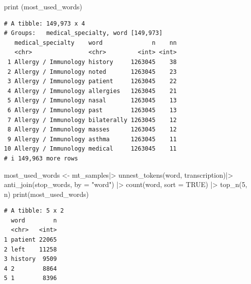 \documentclass[
  letterpaper,
  DIV=11,
  numbers=noendperiod]{scrartcl}
\newenvironment{Shaded}{\begin{snugshade}}{\end{snugshade}}
\newcommand{\AttributeTok}[1]{\textcolor[rgb]{0.40,0.45,0.13}{#1}}
\newcommand{\ConstantTok}[1]{\textcolor[rgb]{0.56,0.35,0.01}{#1}}
\newcommand{\DecValTok}[1]{\textcolor[rgb]{0.68,0.00,0.00}{#1}}
\newcommand{\FunctionTok}[1]{\textcolor[rgb]{0.28,0.35,0.67}{#1}}
\newcommand{\NormalTok}[1]{\textcolor[rgb]{0.00,0.23,0.31}{#1}}
\newcommand{\OtherTok}[1]{\textcolor[rgb]{0.00,0.23,0.31}{#1}}
\newcommand{\SpecialCharTok}[1]{\textcolor[rgb]{0.37,0.37,0.37}{#1}}
\newcommand{\StringTok}[1]{\textcolor[rgb]{0.13,0.47,0.30}{#1}}
\begin{document}
\begin{Shaded}
\begin{Highlighting}[]
\FunctionTok{print}\NormalTok{ (most\_used\_words)}
\end{Highlighting}
\end{Shaded}

\begin{verbatim}
# A tibble: 149,973 x 4
# Groups:   medical_specialty, word [149,973]
   medical_specialty    word              n    nn
   <chr>                <chr>         <int> <int>
 1 Allergy / Immunology history     1263045    38
 2 Allergy / Immunology noted       1263045    23
 3 Allergy / Immunology patient     1263045    22
 4 Allergy / Immunology allergies   1263045    21
 5 Allergy / Immunology nasal       1263045    13
 6 Allergy / Immunology past        1263045    13
 7 Allergy / Immunology bilaterally 1263045    12
 8 Allergy / Immunology masses      1263045    12
 9 Allergy / Immunology asthma      1263045    11
10 Allergy / Immunology medical     1263045    11
# i 149,963 more rows
\end{verbatim}

\begin{Shaded}
\begin{Highlighting}[]
\NormalTok{most\_used\_words }\OtherTok{\textless{}{-}}\NormalTok{ mt\_samples}\SpecialCharTok{|\textgreater{}}
  \FunctionTok{unnest\_tokens}\NormalTok{(word, transcription)}\SpecialCharTok{|\textgreater{}}      
  \FunctionTok{anti\_join}\NormalTok{(stop\_words, }\AttributeTok{by =} \StringTok{"word"}\NormalTok{) }\SpecialCharTok{|\textgreater{}}        
  \FunctionTok{count}\NormalTok{(word, }\AttributeTok{sort =} \ConstantTok{TRUE}\NormalTok{) }\SpecialCharTok{|\textgreater{}}               
  \FunctionTok{top\_n}\NormalTok{(}\DecValTok{5}\NormalTok{, n)}
\FunctionTok{print}\NormalTok{(most\_used\_words)}
\end{Highlighting}
\end{Shaded}

\begin{verbatim}
# A tibble: 5 x 2
  word        n
  <chr>   <int>
1 patient 22065
2 left    11258
3 history  9509
4 2        8864
5 1        8396
\end{verbatim}
\end{document}
